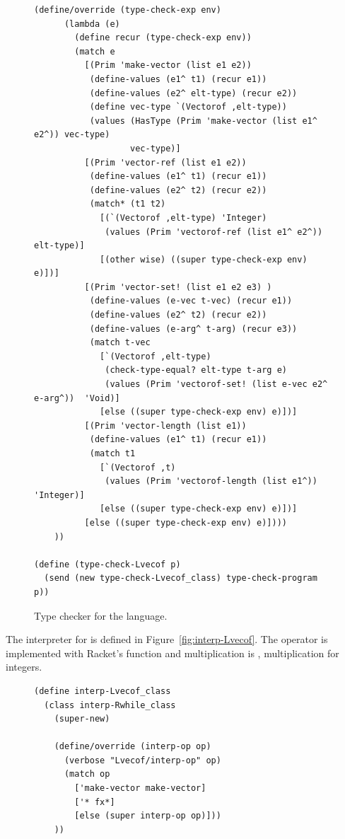 \documentclass[7x10,nocrop]{TimesAPriori_MIT}%
\begin{document}
{\begin{figure}[tbp]
\begin{lstlisting}[basicstyle=\ttfamily\footnotesize]
    (define/override (type-check-exp env)
      (lambda (e)
        (define recur (type-check-exp env))
        (match e
          [(Prim 'make-vector (list e1 e2))
           (define-values (e1^ t1) (recur e1))
           (define-values (e2^ elt-type) (recur e2))
           (define vec-type `(Vectorof ,elt-type))
           (values (HasType (Prim 'make-vector (list e1^ e2^)) vec-type)
                   vec-type)]
          [(Prim 'vector-ref (list e1 e2))
           (define-values (e1^ t1) (recur e1))
           (define-values (e2^ t2) (recur e2))
           (match* (t1 t2)
             [(`(Vectorof ,elt-type) 'Integer)
              (values (Prim 'vectorof-ref (list e1^ e2^)) elt-type)]
             [(other wise) ((super type-check-exp env) e)])]
          [(Prim 'vector-set! (list e1 e2 e3) )
           (define-values (e-vec t-vec) (recur e1))
           (define-values (e2^ t2) (recur e2))
           (define-values (e-arg^ t-arg) (recur e3))
           (match t-vec
             [`(Vectorof ,elt-type)
              (check-type-equal? elt-type t-arg e)
              (values (Prim 'vectorof-set! (list e-vec e2^ e-arg^))  'Void)]
             [else ((super type-check-exp env) e)])]
          [(Prim 'vector-length (list e1))
           (define-values (e1^ t1) (recur e1))
           (match t1
             [`(Vectorof ,t)
              (values (Prim 'vectorof-length (list e1^))  'Integer)]
             [else ((super type-check-exp env) e)])]
          [else ((super type-check-exp env) e)])))
    ))

(define (type-check-Lvecof p)
  (send (new type-check-Lvecof_class) type-check-program p))
\end{lstlisting}
\caption{Type checker for the \LangArray{} language.}
\label{fig:type-check-Lvecof}
\end{figure}

The interpreter for \LangArray{} is defined in
Figure~\ref{fig:interp-Lvecof}.  The  operator is
implemented with Racket's  function and
multiplication is , multiplication for 
integers.

\begin{figure}[tbp]
\begin{lstlisting}[basicstyle=\ttfamily\footnotesize]
(define interp-Lvecof_class
  (class interp-Rwhile_class
    (super-new)

    (define/override (interp-op op)
      (verbose "Lvecof/interp-op" op)
      (match op
        ['make-vector make-vector]
        ['* fx*]
        [else (super interp-op op)]))
    ))


\end{lstlisting}
\end{figure}}
\end{document}

